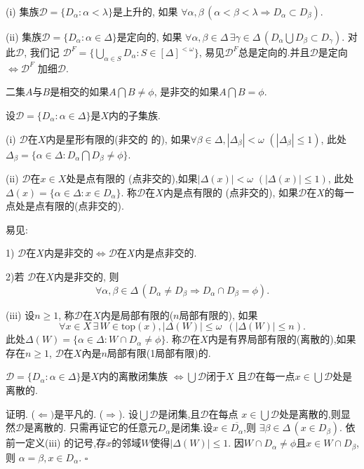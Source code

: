 \documentclass[main.tex]{subfiles}
\begin{document}
\begin{definition}
\textnormal{(i)} 集族$\mathscr{D}=\{D_\alpha: \alpha<\lambda\}$是上升的,
如果
$\forall\alpha, \beta \,(\alpha < \beta < \lambda \Rightarrow D_\alpha \subset D_\beta )$.

\textnormal{(ii)}  集族$\mathscr{D}=\{D_\alpha: \alpha\in\Delta\}$是定向的,
如果
$\forall\alpha, \beta\in\Delta\,\exists \gamma\in \Delta\,
(D_\alpha \bigcup D_\beta \subset D_\gamma)$.
对此$\mathscr{D}$, 我们记
$\mathscr{D}^F = \{\bigcup_{\alpha\in S} D_\alpha: S\in [\Delta]^{<\omega}\}$,
易见$\mathscr{D}^F$总是定向的.并且$\mathscr{D}$是定向
$\Leftrightarrow \mathscr{D}^F$ 加细$\mathscr{D}$.
\end{definition}
二集$A$与$B$是相交的如果$A\bigcap B\ne \phi$, 
是非交的如果$A\bigcap B=\phi$.

\begin{definition}
设$\mathscr{D}=\{D_\alpha: \alpha\in \Delta\}$是$X$内的子集族.

\textnormal{(i)} $\mathscr{D}$在$X$内是星形有限的\textnormal{(}非交的
的\textnormal{)}, 如果$\forall\beta\in\Delta, |\Delta_\beta| < \omega$ $(|\Delta_\beta| \le 1)$, 此处
$\Delta_\beta = \{\alpha\in\Delta: D_\alpha\bigcap D_\beta \ne \phi\}$.
 
\textnormal{(ii)} $\mathscr{D}$在$x\in X$处是点有限的
\textnormal{(}点非交的\textnormal{)},如果$|\Delta(x)| < \omega$ $(|\Delta(x)| \le 1)$, 此处
$\Delta(x) = \{\alpha\in\Delta: x\in D_\alpha\}$.
称$\mathscr{D}$在$X$内是点有限的 
\textnormal{(}点非交的\textnormal{)}, 如果$\mathscr{D}$在$X$的每一点处是点有限的\textnormal{(}点非交的\textnormal{)}.
\end{definition}
易见:

1) $\mathscr{D}$在$X$内是非交的$\Leftrightarrow$$\mathscr{D}$在$X$内是点非交的.

2)若 $\mathscr{D}$在$X$内是非交的, 则
$$\forall \alpha,\beta\in\Delta \,(D_\alpha \ne D_\beta
\Rightarrow D_\alpha\cap D_\beta = \phi).$$

{\kaishu
(iii) 设$n\ge 1$, 称$\mathscr{D}$在$X$内是局部有限的($n$局部有限的),
如果
$$\forall x\in X\, \exists\,W\in\textrm{top}(x), |\Delta(W)| \le \omega\,\,\, (|\Delta(W)| \le n).$$
此处$\Delta(W)= \{\alpha\in \Delta: W\cap D_\alpha \ne \phi\}$.
称$\mathscr{D}$在$X$内是有界局部有限的(离散的),如果存在$n\ge 1$, 
$\mathscr{D}$在$X$內是$n$局部有限(1局部有限)的.
}

\begin{fact}
$\mathscr{D}=\{D_\alpha: \alpha\in \Delta\}$是$X$内的离散闭集族
$\Leftrightarrow\bigcup\mathscr{D}$闭于$X$ 
且$\mathscr{D}$在每一点$x\in\bigcup\mathscr{D}$处是离散的.
\end{fact}
证明. ($\Leftarrow)$是平凡的.
($\Rightarrow$). 设$\bigcup\mathscr{D}$是闭集,且$\mathscr{D}$在每点
$x\in\bigcup\mathscr{D}$处是离散的,则显然$\mathscr{D}$是离散的.
只需再证它的任意元$D_\alpha$是闭集.设$x\in\overline{D_\alpha}$,则
$\exists\beta\in\Delta \, (x\in D_\beta)$.
依前一定义(iii) 的记号,存$x$的邻域$W$使得$|\Delta(W)|\le 1$. 
因$W\cap D_\alpha \ne \phi$且$x\in W\cap D_\beta$, 则
$\alpha = \beta, x\in D_\alpha$.
$\square$
\end{document}
